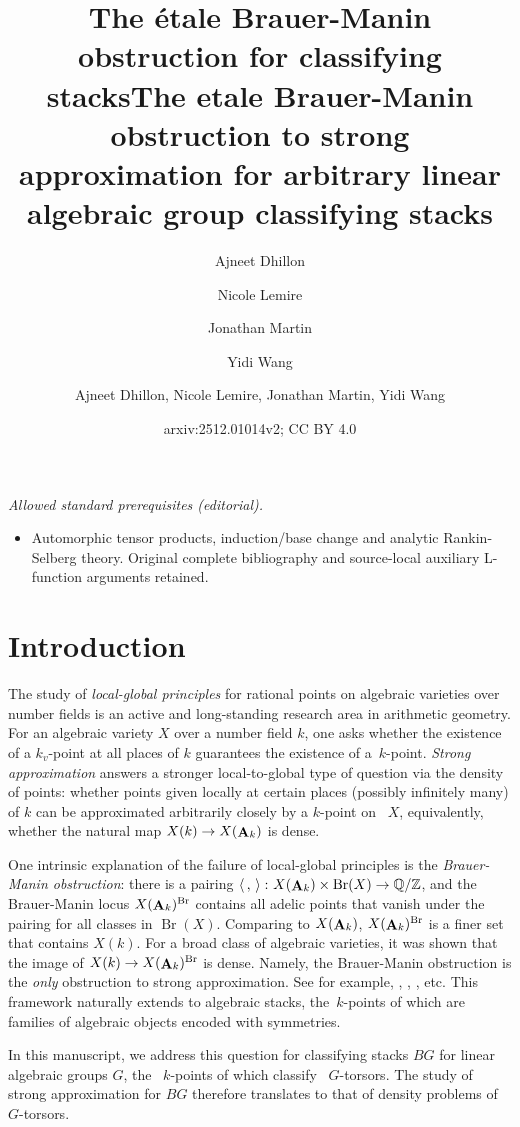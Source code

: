 \documentclass[12pt, final]{amsart}
\title[The \'{e}tale Brauer-Manin Obstruction]{ The \'{e}tale Brauer-Manin obstruction for classifying stacks}
\author[Ajneet Dhillon]{Ajneet Dhillon}
\author[Nicole Lemire]{Nicole Lemire}
\author[Jonathan Martin]{Jonathan Martin}
\author[Yidi Wang]{Yidi Wang}
\title{The etale Brauer-Manin obstruction to strong approximation for arbitrary linear algebraic group classifying stacks}
\author{Ajneet Dhillon, Nicole Lemire, Jonathan Martin, Yidi Wang}
\date{arxiv:2512.01014v2; CC BY 4.0}
\theoremstyle{remark}
\theoremstyle{definition}
\theoremstyle{plain}
\newcommand{\ZZ}{\mathbb{Z}}
\newcommand{\QQ}{\mathbb{Q}}
\DeclareMathOperator{\bA}{{\bf A}}
\DeclareMathOperator{\Br}{Br}
\begin{document}
\maketitle
\noindent\textit{Allowed standard prerequisites (editorial).}\begin{itemize}
\item Automorphic tensor products, induction/base change and analytic Rankin-Selberg theory. Original complete bibliography and source-local auxiliary L-function arguments retained.
\end{itemize}\medskip
\section{Introduction}

The study of \emph{local-global principles} for rational points on algebraic varieties over number fields is an active and long-standing research area in arithmetic geometry. For an algebraic variety $X$ over a number field $k$, one asks whether the existence of a $k_v$-point at all places of $k$ guarantees the existence of a~$k$-point. \emph{Strong approximation} answers a stronger local-to-global type of question via the density of points: whether points given locally at certain places (possibly infinitely many) of $k$ 
can be approximated arbitrarily closely by a $k$-point on ~$X$, equivalently, whether the natural map $X(k) \to X(\bA_k)$ is dense.

One intrinsic explanation of the failure of local-global principles is the 
\emph{Brauer-Manin obstruction}: there is a pairing $\left< \, ,\, \right>\colon X(\bA_k) \times \Br(X) \to \QQ/\ZZ$, and the Brauer-Manin locus $X(\bA_k)^{\Br}$ contains all adelic points that vanish under the pairing for all classes in $\Br(X)$. Comparing to $X(\bA_k)$, $X(\bA_k)^{\Br}$ is a finer set that contains $X(k)$.
For a broad class of algebraic varieties, it was shown that the image of $X(k) \to X(\bA_k)^{\Br}$ is dense. Namely, the Brauer-Manin obstruction is the \emph{only} obstruction to strong approximation. See for example, \cite{borovoi-demarche:13}, \cite{Demarche2010}, \cite{Harari2008}, etc.
This framework naturally extends to algebraic stacks, the~$k$-points of which are families of algebraic objects encoded with symmetries. 

In this manuscript, we address this question for classifying stacks $BG$ for linear algebraic groups $G$, the ~$k$-points of which classify ~$G$-torsors. The study of strong approximation for $BG$ therefore translates to that of density problems of~$G$-torsors. 
\end{document}
